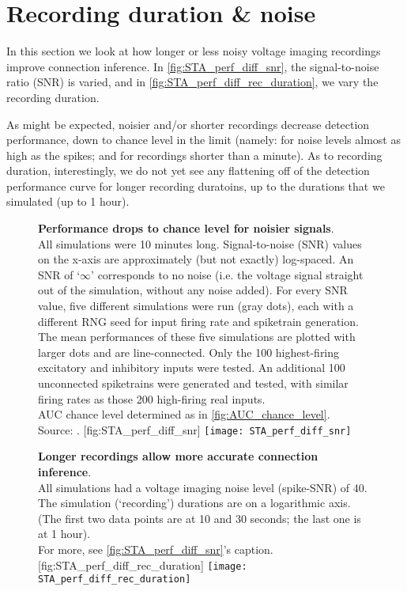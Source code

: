 \FloatBarrier
\section{Recording duration \& noise}

In this section we look at how longer or less noisy voltage imaging recordings improve connection inference. In \cref{fig:STA_perf_diff_snr}, the signal-to-noise ratio (SNR) is varied, and in \cref{fig:STA_perf_diff_rec_duration}, we vary the recording duration.

As might be expected, noisier and/or shorter recordings decrease detection performance, down to chance level in the limit (namely: for noise levels almost as high as the spikes; and for recordings shorter than a minute). As to recording duration, interestingly, we do not yet see any flattening off of the detection performance curve for longer recording duratoins, up to the durations that we simulated (up to 1 hour).

\begin{figure}
    \begin{sidecaption}
        {\textbf{Performance drops to chance level for noisier signals}.\\
        All simulations were 10 minutes long.
        Signal-to-noise (SNR) values on the x-axis are approximately (but not exactly) log-spaced. An SNR of `$\infty$' corresponds to no noise (i.e. the voltage signal straight out of the simulation, without any noise added).
        For every SNR value, five different simulations were run (gray dots), each with a different RNG seed for input firing rate and spiketrain generation. The mean performances of these five simulations are plotted with larger dots and are line-connected.
        Only the 100 highest-firing excitatory and inhibitory inputs were tested. An additional 100 unconnected spiketrains were generated and tested, with similar firing rates as those 200 high-firing real inputs.\\
        AUC chance level determined as in \cref{fig:AUC_chance_level}.\\
        Source: .}
        [fig:STA_perf_diff_snr]
        \texttt{[image: STA\_perf\_diff\_snr]}
    \end{sidecaption}
\end{figure}

\begin{figure}
    \begin{sidecaption}
        {\textbf{Longer recordings allow more accurate connection inference}.\\
        All simulations had a voltage imaging noise level (spike-SNR) of 40.\\
        The simulation (`recording') durations are on a logarithmic axis. (The first two data points are at 10 and 30 seconds; the last one is at 1 hour). \\
        For more, see \cref{fig:STA_perf_diff_snr}'s caption.}
        [fig:STA_perf_diff_rec_duration]
        \texttt{[image: STA\_perf\_diff\_rec\_duration]}
    \end{sidecaption}
\end{figure}

